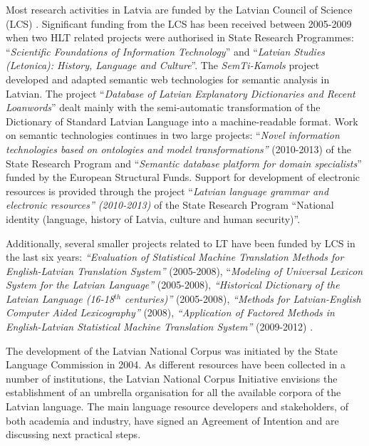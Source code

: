 \begin{multicols}{2}
Most research activities in Latvia are funded by the Latvian Council of Science (LCS) \cite{Meta2}.
Significant funding from the LCS has been received between 2005-2009 when two HLT related projects were authorised in State Research Programmes: ``\textit{Scientific Foundations of Information Technology}'' and ``\textit{Latvian Studies (Letonica): History, Language and Culture}''.
The \textit{SemTi-Kamols} project \cite{Meta39} developed and adapted semantic web technologies for semantic analysis in Latvian.
The project ``\textit{Database of Latvian Explanatory Dictionaries and Recent Loanwords}'' dealt mainly with the semi-automatic transformation of the Dictionary of Standard Latvian Language into a machine-readable format.
Work on semantic technologies continues in two large projects: ``\textit{Novel information technologies based on ontologies and model transformations''} (2010-2013) of the State Research Program and ``\textit{Semantic database platform for domain specialists}'' funded by the European Structural Funds.
Support for development of electronic resources is provided through the project ``\textit{Latvian language grammar and electronic resources'' (2010-2013)} of the State Research Program ``National identity (language, history of Latvia, culture and human security)''. 

Additionally, several smaller projects related to LT have been funded by LCS in the last six years: \textit{``Evaluation of Statistical Machine Translation Methods for English-Latvian Translation System''} (2005-2008), ``\textit{Modeling of Universal Lexicon System for the Latvian Language''} (2005-2008), \textit{``Historical Dictionary of the Latvian Language (16-18${}^{th}$ centuries)''} (2005-2008), \textit{``Methods for Latvian-English Computer Aided Lexicography''} (2008), \textit{``Application of Factored Methods in English-Latvian Statistical Machine Translation System''} (2009-2012) \cite{Meta27}.

The development of the Latvian National Corpus was initiated by the State Language Commission in 2004.
As different resources have been collected in a number of institutions, the Latvian National Corpus Initiative envisions the establishment of an umbrella organisation for all the available corpora of the Latvian language.
The main language resource developers and stakeholders, of both academia and industry, have signed an Agreement of Intention and are discussing next practical steps.


\end{multicols}
